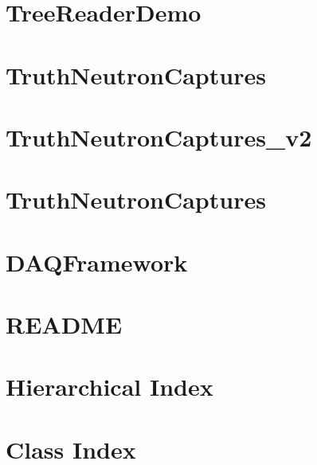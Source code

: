 \let\mypdfximage\pdfximage\def\pdfximage{\immediate\mypdfximage}\documentclass[twoside]{book}
\newcommand{\+}{\discretionary{\mbox{\scriptsize$\hookleftarrow$}}{}{}}
\begin{document}
\chapter{Tree\+Reader\+Demo}
\label{md_UserTools_TreeReaderDemo_README}

\chapter{Truth\+Neutron\+Captures}
\label{md_UserTools_TruthNeutronCaptures_README}

\chapter{Truth\+Neutron\+Captures\+\_\+v2}
\label{md_UserTools_TruthNeutronCaptures_v2_README}

\chapter{Truth\+Neutron\+Captures}
\label{md_UserTools_TruthNeutronCaptures_v3_README}

\chapter{DAQFramework}
\label{md_UserTools_vectgen_README}

\chapter{README}
\label{md_DataModel_README}

\chapter{Hierarchical Index}

\chapter{Class Index}

\end{document}
